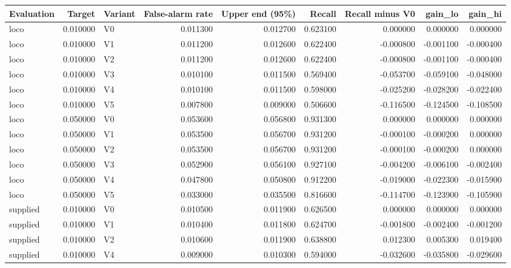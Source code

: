 \begin{tabular}{lrlrrrrrr}
\toprule
Evaluation & Target & Variant & False-alarm rate & Upper end (95\%) & Recall & Recall minus V0 & gain\_lo & gain\_hi \\
\midrule
loco & 0.010000 & V0 & 0.011300 & 0.012700 & 0.623100 & 0.000000 & 0.000000 & 0.000000 \\
loco & 0.010000 & V1 & 0.011200 & 0.012600 & 0.622400 & -0.000800 & -0.001100 & -0.000400 \\
loco & 0.010000 & V2 & 0.011200 & 0.012600 & 0.622400 & -0.000800 & -0.001100 & -0.000400 \\
loco & 0.010000 & V3 & 0.010100 & 0.011500 & 0.569400 & -0.053700 & -0.059100 & -0.048000 \\
loco & 0.010000 & V4 & 0.010100 & 0.011500 & 0.598000 & -0.025200 & -0.028200 & -0.022400 \\
loco & 0.010000 & V5 & 0.007800 & 0.009000 & 0.506600 & -0.116500 & -0.124500 & -0.108500 \\
loco & 0.050000 & V0 & 0.053600 & 0.056800 & 0.931300 & 0.000000 & 0.000000 & 0.000000 \\
loco & 0.050000 & V1 & 0.053500 & 0.056700 & 0.931200 & -0.000100 & -0.000200 & 0.000000 \\
loco & 0.050000 & V2 & 0.053500 & 0.056700 & 0.931200 & -0.000100 & -0.000200 & 0.000000 \\
loco & 0.050000 & V3 & 0.052900 & 0.056100 & 0.927100 & -0.004200 & -0.006100 & -0.002400 \\
loco & 0.050000 & V4 & 0.047800 & 0.050800 & 0.912200 & -0.019000 & -0.022300 & -0.015900 \\
loco & 0.050000 & V5 & 0.033000 & 0.035500 & 0.816600 & -0.114700 & -0.123900 & -0.105900 \\
supplied & 0.010000 & V0 & 0.010500 & 0.011900 & 0.626500 & 0.000000 & 0.000000 & 0.000000 \\
supplied & 0.010000 & V1 & 0.010400 & 0.011800 & 0.624700 & -0.001800 & -0.002400 & -0.001200 \\
supplied & 0.010000 & V2 & 0.010600 & 0.011900 & 0.638800 & 0.012300 & 0.005300 & 0.019400 \\
supplied & 0.010000 & V4 & 0.009000 & 0.010300 & 0.594000 & -0.032600 & -0.035800 & -0.029600 \\

\end{tabular}
